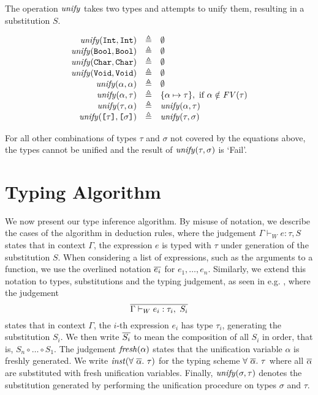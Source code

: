 The operation $\mathit{unify}$ takes two types and attempts to unify them, resulting in
a substitution $S$.

\[
\begin{array}{rcl}
  \mathit{unify}(\texttt{Int},\texttt{Int}) & \triangleq & \emptyset \\
  \mathit{unify}(\texttt{Bool},\texttt{Bool}) & \triangleq & \emptyset \\
  \mathit{unify}(\texttt{Char},\texttt{Char}) & \triangleq & \emptyset \\
  \mathit{unify}(\texttt{Void},\texttt{Void}) & \triangleq & \emptyset \\
  \mathit{unify}(\alpha,\alpha) & \triangleq & \emptyset \\
  \mathit{unify}(\alpha,\tau) & \triangleq &
    \{ \alpha \mapsto \tau \},\ \text{if}\ \alpha \notin \mathit{FV}(\tau) \\
  \mathit{unify}(\tau,\alpha) & \triangleq & \mathit{unify}(\alpha,\tau) \\
  \mathit{unify}(\texttt{[}\tau\texttt{]},\texttt{[}\sigma\texttt{]}) & \triangleq & \mathit{unify}(\tau,\sigma)
\end{array}
\]

For all other combinations of types $\tau$ and $\sigma$ not covered by the
equations above, the types cannot be unified and the result of
$\mathit{unify}(\tau,\sigma)$ is `\textsf{Fail}'.


\section{Typing Algorithm}

We now present our type inference algorithm. By misuse of notation, we describe
the cases of the algorithm in deduction rules, where the judgement
$\Gamma \vdash_W e : \tau, S$ states that in context $\Gamma$, the expression $e$
is typed with $\tau$ under generation of the substitution $S$.
When considering a list of expressions, such as the arguments to a function, we
use the overlined notation $\overline{e_i}$ for $e_1,\dots,e_n$. Similarly, we
extend this notation to types, substitutions and the typing judgement, as seen
in e.g. , where the judgement
\[ \overline{ \Gamma \vdash_W e_i : \tau_i,\ S_i } \]
states that in context $\Gamma$, the $i$-th expression $e_i$ has type $\tau_i$,
generating the substitution $S_i$. We then write $\overline{S_i}$ to mean the
composition of all $S_i$ in order, that is, $S_n \circ \dots \circ S_1$.
The judgement $\mathit{fresh}(\alpha)$ states that the unification variable $\alpha$ is
freshly generated. We write $\mathit{inst}(\forall\ \overline{\alpha}.\ \tau)$ for the
typing scheme $\forall\ \overline{\alpha}.\ \tau$ where all $\overline{\alpha}$ are
substituted with fresh unification variables.
Finally, $\mathit{unify}(\sigma,\tau)$ denotes the substitution generated by performing
the unification procedure on types $\sigma$ and $\tau$.

